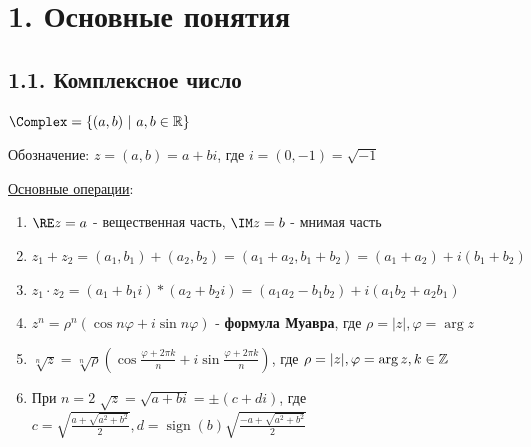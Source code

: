 \documentclass[12pt]{article}
\begin{document}
    \tableofcontents
    \clearpage






\section{1. Основные понятия}

\subsection{1.1. Комплексное число}

\Mem $\Complex = \{ (a, b) \ | \ a, b \in \Real\}$

Обозначение: $z = (a, b) = a + bi$, где $i = (0, -1) = \sqrt{-1}$

\underline{Основные операции}:

\begin{enumerate}
    \item $\RE z = a$ - вещественная часть, $\IM z = b$ - мнимая часть
    \item $z_1 + z_2 = (a_1, b_1) + (a_2, b_2) = (a_1 + a_2, b_1 + b_2) = (a_1 + a_2) + i(b_1 + b_2)$
    \item $z_1 \cdot z_2 = (a_1 + b_1 i) * (a_2 + b_2 i) = (a_1 a_2 - b_1 b_2) + i (a_1 b_2 + a_2 b_1)$
    \item $z^n = \rho^n (\cos n\varphi + i \sin n\varphi)$ - \textbf{формула Муавра}, где $\rho = |z|, \varphi = \arg z$
    \item $\sqrt[n]{z} = \sqrt[n]{\rho} \left(\cos \frac{\varphi + 2\pi k}{n} + i \sin \frac{\varphi + 2\pi k}{n}\right)$, где $\rho = |z|, \varphi = \arg z, k \in \mathbb{Z}$
    \item При $n = 2$ $\sqrt{z} = \sqrt{a + bi} = \pm (c + di)$, 
        где $c = \sqrt{\frac{a + \sqrt{a^2 + b^2}}{2}}, d = \operatorname{sign}(b) \sqrt{\frac{-a + \sqrt{a^2 + b^2}}{2}}$
\end{enumerate}
\end{document}
